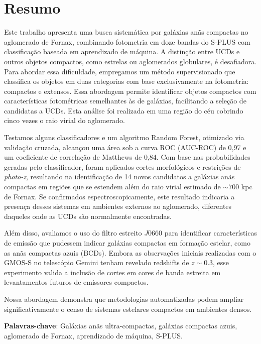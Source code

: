 \thispagestyle{empty}
\chapter*{Resumo}
Este trabalho apresenta uma busca sistemática por galáxias anãs compactas no aglomerado de Fornax, combinando fotometria em doze bandas do S-PLUS com classificação baseada em aprendizado de máquina. A distinção entre UCDs e outros objetos compactos, como estrelas ou aglomerados globulares, é desafiadora. Para abordar essa dificuldade, empregamos um método supervisionado que classifica os objetos em duas categorias com base exclusivamente na fotometria: compactos e extensos. Essa abordagem permite identificar objetos compactos com características fotométricas semelhantes às de galáxias, facilitando a seleção de candidatas a UCDs. Esta análise foi realizada em uma região do céu cobrindo cinco vezes o raio virial do aglomerado.

Testamos alguns classificadores e um algoritmo Random Forest, otimizado via validação cruzada, alcançou uma área sob a curva ROC (AUC-ROC) de 0,97 e um coeficiente de correlação de Matthews de 0,84. Com base nas probabilidades geradas pelo classificador, foram aplicados cortes morfológicos e restrições de \textit{photo-z}, resultando na identificação de 14 novos candidatos a galáxias anãs compactas em regiões que se estendem além do raio virial estimado de $\sim700$ kpc de Fornax. Se confirmados espectroscopicamente, este resultado indicaria a presença desses sistemas em ambientes externos ao aglomerado, diferentes daqueles onde as UCDs são normalmente encontradas.

Além disso, avaliamos o uso do filtro estreito $J0660$ para identificar características de emissão que pudessem indicar galáxias compactas em formação estelar, como as anãs compactas azuis (BCDs). Embora as observações iniciais realizadas com o GMOS-S no telescópio Gemini tenham revelado redshifts de $z \sim 0.3$, esse experimento valida a inclusão de cortes em cores de banda estreita em levantamentos futuros de emissores compactos.

Nossa abordagem demonstra que metodologias automatizadas podem ampliar significativamente o censo de sistemas estelares compactos em ambientes densos.

\textbf{Palavras-chave}: Galáxias anãs ultra-compactas, galáxias compactas azuis, aglomerado de Fornax, aprendizado de máquina, S-PLUS.


